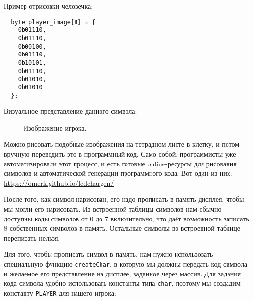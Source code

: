 \documentclass[../sparc.tex]{subfiles}
\begin{document}
Пример отрисовки человечка:

\begin{verbatim}
  byte player_image[8] = {
    0b01110,
    0b01110,
    0b00100,
    0b01110,
    0b10101,
    0b01110,
    0b01010,
    0b01010
  };
\end{verbatim}

Визуальное представление данного символа:

\begin{figure}[ht]
  \centering
  \caption{Изображение игрока.}
  \label{fig:game-dev-char-symbol-example}
\end{figure}

Можно рисовать подобные изображения на тетрадном листе в клетку, и потом вручную
переводить это в программный код.  Само собой, программисты уже автоматизировали
этот процесс, и есть готовые online-ресурсы для рисования символов и
автоматической генерации программного кода.  Вот один из них:
\url{https://omerk.github.io/lcdchargen/}

После того, как символ нарисован, его надо прописать в память дисплея, чтобы мы
могли его нарисовать.  Из встроенной таблицы символов нам обычно доступны коды
символов от 0 до 7 включительно, что даёт возможность записать 8 собственных
символов в память.  Остальные символы во встроенной таблице переписать нельзя.

Для того, чтобы прописать символ в память, нам нужно использовать специальную
функцию \texttt{createChar}, в которую мы должны передать код символа и желаемое
его представление на дисплее, заданное через массив.  Для задания кода символа
удобно использовать константы типа \texttt{char}, поэтому мы создадим константу
\texttt{PLAYER} для нашего игрока:
\end{document}
